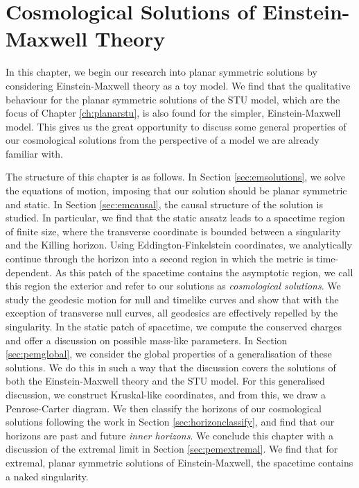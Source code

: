 \chapter{Cosmological Solutions of Einstein-Maxwell Theory}
\label{ch:planarem}

In this chapter, we begin our research into planar symmetric solutions by considering Einstein-Maxwell theory as a toy model. We find that the qualitative behaviour for the planar symmetric solutions of the STU model, which are the focus of Chapter \ref{ch:planarstu}, is also found for the simpler, Einstein-Maxwell model. This gives us the great opportunity to discuss some general properties of our cosmological solutions from the perspective of a model we are already familiar with.

The structure of this chapter is as follows. In Section \ref{sec:emsolutions}, we solve the equations of motion, imposing that our solution should be planar symmetric and static. In Section \ref{sec:emcausal}, the causal structure of the solution is studied. In particular, we find that the static ansatz leads to a spacetime region of finite size, where the transverse coordinate is bounded between a singularity and the Killing horizon. Using Eddington-Finkelstein coordinates, we analytically continue through the horizon into a second region in which the metric is time-dependent. As this patch of the spacetime contains the asymptotic region, we call this region the exterior and refer to our solutions as \emph{cosmological solutions}. We study the geodesic motion for null and timelike curves and show that with the exception of transverse null curves, all geodesics are effectively repelled by the singularity. In the static patch of spacetime, we compute the conserved charges and offer a discussion on possible mass-like parameters. In Section \ref{sec:pemglobal}, we consider the global properties of a generalisation of these solutions. We do this in such a way that the discussion covers the solutions of both the Einstein-Maxwell theory and the STU model. For this generalised discussion, we construct Kruskal-like coordinates, and from this, we draw a Penrose-Carter diagram. We then classify the horizons of our cosmological solutions following the work in Section \ref{sec:horizonclassify}, and find that our horizons are past and future \emph{inner horizons}. We conclude this chapter with a discussion of the extremal limit in Section \ref{sec:pemextremal}. We find that for extremal, planar symmetric solutions of Einstein-Maxwell, the spacetime contains a naked singularity.

